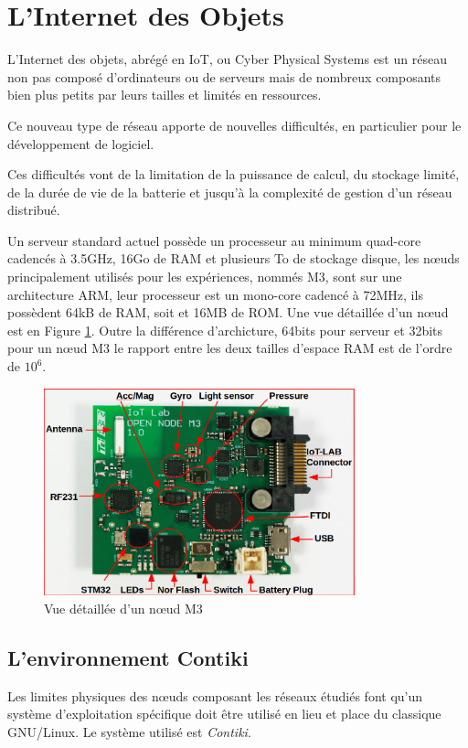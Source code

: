 \section{L'Internet des Objets}

L'Internet des objets, abrégé en IoT, ou Cyber Physical Systems est un réseau non pas composé d'ordinateurs ou de serveurs mais de nombreux composants bien plus petits par leurs tailles et limités en ressources.

Ce nouveau type de réseau apporte de nouvelles difficultés, en particulier pour le développement de logiciel.

Ces difficultés vont de la limitation de la puissance de calcul, du stockage limité, de la durée de vie de la batterie et jusqu'à la complexité de gestion d'un réseau distribué.

Un serveur standard actuel possède un processeur au minimum quad-core cadencés à 3.5GHz, 16Go de RAM et plusieurs To de stockage disque, les nœuds principalement utilisés pour les expériences, nommés M3, sont sur une architecture ARM, leur processeur est un mono-core cadencé à 72MHz, ils possèdent 64kB de RAM, soit et 16MB de ROM. Une vue détaillée d'un nœud est en Figure \ref{m3}. Outre la différence d'archicture, 64bits pour serveur et 32bits pour un nœud M3 le rapport entre les deux tailles d'espace RAM est de l'ordre de $10^{6}$.

\begin{figure}[ht!]
\centering
\includegraphics[width=90mm]{images/m3opennode.png}
\caption{Vue détaillée d'un nœud M3}
\label{m3}
\end{figure}

\subsection{L'environnement Contiki}

Les limites physiques des nœuds composant les réseaux étudiés font qu'un système d'exploitation spécifique doit être utilisé en lieu et place du classique GNU/Linux. Le système utilisé est \emph{Contiki}\cite{contiki}.

